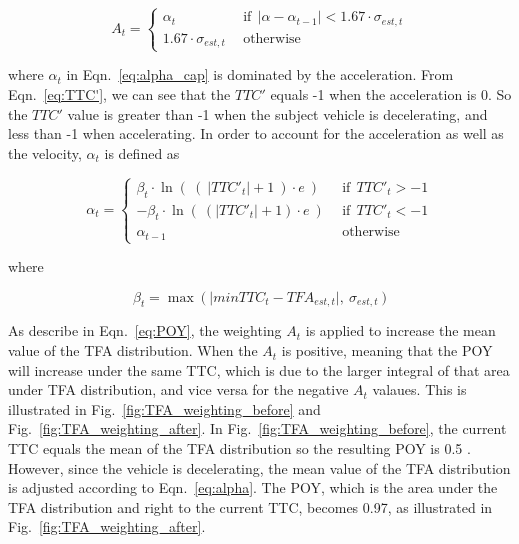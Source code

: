 \begin{equation}
    A_{t} = 
    \begin{cases} 
      \alpha_{t} &~~\text{if}~~ \lvert \alpha - \alpha_{t-1}  \rvert < 1.67 \cdot \sigma_{est, t}\\
      1.67 \cdot \sigma_{est, t} &~~\text{otherwise}
    \end{cases}
\label{eq:alpha_cap}
\end{equation}

\noindent where $\alpha_t$ in Eqn.~\ref{eq:alpha_cap} is dominated by the acceleration. From Eqn.~\ref{eq:TTC'}, we can see that the $TTC'$ equals -1 when the acceleration is 0. So the $TTC'$ value is greater than -1 when the subject vehicle is decelerating, and less than -1 when accelerating. In order to account for the acceleration as well as the velocity, $\alpha_t$ is defined as 

\begin{equation}
    \alpha_{t} = 
    \begin{cases} 
      \beta_{t} \cdot \ln \left ( ~ \left( ~ \lvert {TTC'}_{t}  \rvert + 1 ~\right) \cdot e~ \right) &~~\text{if}~~ {TTC'}_{t} > -1\\
      - \beta_{t} \cdot \ln \left ( ~ \left( \lvert {TTC'}_{t}  \rvert + 1 \right) \cdot e~ \right) &~~\text{if}~~ {TTC'}_{t} < -1 \\
      \alpha_{t-1} &~~\text{otherwise}
    \end{cases}
\label{eq:alpha}
\end{equation}

\noindent where

\begin{equation}
    \beta_{t} = 
     \max ~ \big( ~ \lvert {min TTC}_{t} - TFA_{est, t} \rvert, ~ \sigma_{est, t} ~ \big)
\label{eq:beta}
\end{equation}



As describe in Eqn.~\ref{eq:POY}, the weighting $A_t$ is applied to increase the mean value of the TFA distribution. When the $A_t$ is positive, meaning that the POY will increase under the same TTC, which is due to the larger integral of that area under TFA distribution, and vice versa for the negative $A_t$ valaues. This is illustrated in Fig.~\ref{fig:TFA_weighting_before} and Fig.~\ref{fig:TFA_weighting_after}. In Fig.~\ref{fig:TFA_weighting_before}, the current TTC equals the mean of the TFA distribution so the resulting POY is 0.5 . However, since the vehicle is decelerating, the mean value of the TFA distribution is adjusted according to Eqn.~\ref{eq:alpha}. The POY, which is the area under the TFA distribution and right to the current TTC, becomes 0.97, as illustrated in Fig.~\ref{fig:TFA_weighting_after}.

